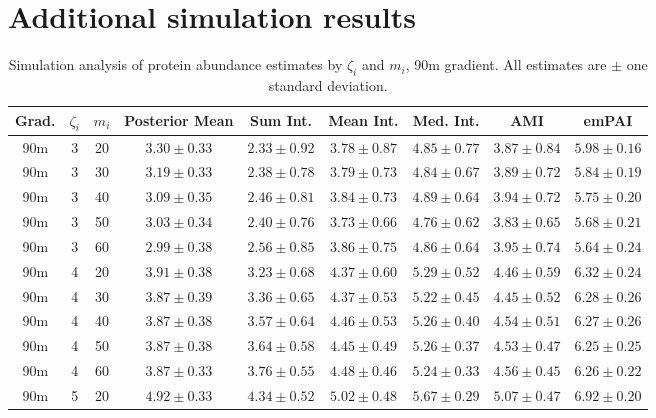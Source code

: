 
\clearpage

\section{Additional simulation results}

\begin{table}
\begin{center}
\caption{Simulation analysis of protein abundance estimates by $\zeta_i$ and $m_i$, 90m gradient. All estimates are $\pm$ one standard deviation. \label{tab:sim_estimates_90m}}
\begin{tabular}{ccc|c|ccccc}
 Grad. & $\zeta_i$ & $m_i$ & Posterior Mean & Sum Int. & Mean Int. & Med. Int. & AMI & emPAI \\ 
  \hline
90m &   3 &  20 & $3.30 \pm 0.33$ & $2.33 \pm 0.92$ & $3.78 \pm 0.87$ & $4.85 \pm 0.77$ & $3.87 \pm 0.84$ & $5.98 \pm 0.16$ \\ 
  90m &   3 &  30 & $3.19 \pm 0.33$ & $2.38 \pm 0.78$ & $3.79 \pm 0.73$ & $4.84 \pm 0.67$ & $3.89 \pm 0.72$ & $5.84 \pm 0.19$ \\ 
  90m &   3 &  40 & $3.09 \pm 0.35$ & $2.46 \pm 0.81$ & $3.84 \pm 0.73$ & $4.89 \pm 0.64$ & $3.94 \pm 0.72$ & $5.75 \pm 0.20$ \\ 
  90m &   3 &  50 & $3.03 \pm 0.34$ & $2.40 \pm 0.76$ & $3.73 \pm 0.66$ & $4.76 \pm 0.62$ & $3.83 \pm 0.65$ & $5.68 \pm 0.21$ \\ 
  90m &   3 &  60 & $2.99 \pm 0.38$ & $2.56 \pm 0.85$ & $3.86 \pm 0.75$ & $4.86 \pm 0.64$ & $3.95 \pm 0.74$ & $5.64 \pm 0.24$ \\ 
   \hline
90m &   4 &  20 & $3.91 \pm 0.38$ & $3.23 \pm 0.68$ & $4.37 \pm 0.60$ & $5.29 \pm 0.52$ & $4.46 \pm 0.59$ & $6.32 \pm 0.24$ \\ 
  90m &   4 &  30 & $3.87 \pm 0.39$ & $3.36 \pm 0.65$ & $4.37 \pm 0.53$ & $5.22 \pm 0.45$ & $4.45 \pm 0.52$ & $6.28 \pm 0.26$ \\ 
  90m &   4 &  40 & $3.87 \pm 0.38$ & $3.57 \pm 0.64$ & $4.46 \pm 0.53$ & $5.26 \pm 0.40$ & $4.54 \pm 0.51$ & $6.27 \pm 0.26$ \\ 
  90m &   4 &  50 & $3.87 \pm 0.38$ & $3.64 \pm 0.58$ & $4.45 \pm 0.49$ & $5.26 \pm 0.37$ & $4.53 \pm 0.47$ & $6.25 \pm 0.25$ \\ 
  90m &   4 &  60 & $3.87 \pm 0.33$ & $3.76 \pm 0.55$ & $4.48 \pm 0.46$ & $5.24 \pm 0.33$ & $4.56 \pm 0.45$ & $6.26 \pm 0.22$ \\ 
   \hline
90m &   5 &  20 & $4.92 \pm 0.33$ & $4.34 \pm 0.52$ & $5.02 \pm 0.48$ & $5.67 \pm 0.29$ & $5.07 \pm 0.47$ & $6.92 \pm 0.20$ \\ 

\end{tabular}
\end{center}
\end{table}

